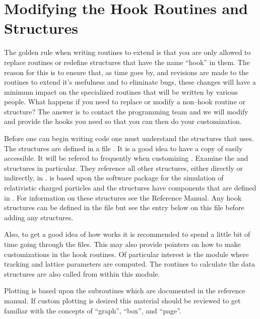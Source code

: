 \section{Modifying the Hook Routines and Structures}

The golden rule when writing routines to extend \tao is that you are
only allowed to replace routines or redefine structures that have the
name ``hook'' in them. The reason for this is to ensure that, as time
goes by, and revisions are made to the \tao routines to extend it's
usefulness and to eliminate bugs, these changes will
have a minimum impact on the specialized routines that will be written
by various people.  What happens if you need to replace
or modify a non--hook routine or structure?  The answer is to contact
the \tao programming team and we will modify \tao and provide the hooks 
you need so that you can then do your customization.

Before one can begin writing code one must understand the structures
that \tao uses. The structures are defined in a file
. It is a good idea to have a copy of
 easily accessible. It will be refered to frequently
when customizing \tao. Examine the  and
 structures in particular. They reference all other
structures, either directly or indirectly, in . 
\tao is based upon the \bmad software
package for the simulation of relativistic charged particles and the
\tao structures have components that are defined in \bmad. For
information on these structures see the \bmad Reference Manual. Any hook 
structures can be defined in the file  but see the entry
below on this file before adding any structures.

Also, to get a good idea of how \tao works it is recommended to spend a
little bit of time going through the  files. This may also
provide pointers on how to make customizations in the hook routines. Of
particular interest is the module  where tracking
and lattice parameters are computed. The routines to calculate the data structures
are also called from within this module.

Plotting is based upon the  subroutines which are
documented in the \bmad reference manual. If custom plotting is
desired this material should be reviewed to get familiar with the
concepts of ``graph'', ``box'', and ``page''.

